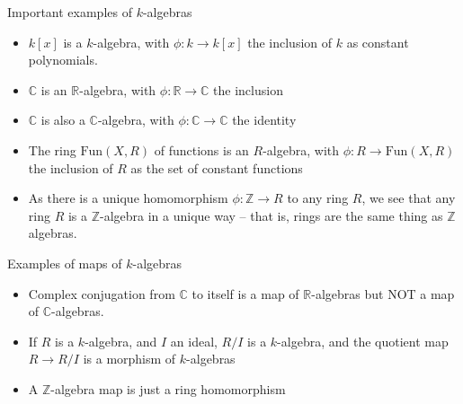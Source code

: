 \documentclass{beamer}
\newcommand{\C}{\mathbb{C}}
\newcommand{\Z}{\mathbb{Z}}
\newcommand{\R}{\mathbb{R}}
\begin{document}
\begin{frame}[fragile]{Important examples of $k$-algebras}

\begin{itemize}
\item $k[x]$ is a $k$-algebra, with $\phi:k\to k[x]$ the inclusion of $k$ as constant polynomials.
\item $\C$ is an $\R$-algebra, with $\phi:\R\to \C$ the inclusion
\item $\C$ is also a $\C$-algebra, with $\phi:\C\to \C$ the identity

\item The ring $\textrm{Fun}(X,R)$ of functions is an $R$-algebra, with $\phi:R\to\textrm{Fun}(X,R)$ the inclusion of $R$ as the set of constant functions 

\item As there is a unique homomorphism $\phi:\Z\to R$ to any ring $R$, we see that any ring $R$ is a $\Z$-algebra in a unique way -- that is, rings are the same thing as $\Z$ algebras.
\end{itemize}
\end{frame}

\begin{frame}{Examples of maps of $k$-algebras}
\begin{itemize}



\item Complex conjugation from $\C$ to itself is a map of $\R$-algebras but NOT a map of $\C$-algebras.
\item If $R$ is a $k$-algebra, and $I$ an ideal, $R/I$ is a $k$-algebra, and the quotient map $R\to R/I$ is a morphism of $k$-algebras
\item A $\Z$-algebra map is just a ring homomorphism



\end{itemize}



\end{frame}
\end{document}
